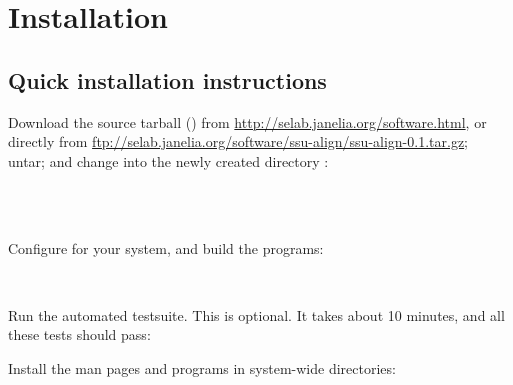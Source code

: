 
\section{Installation}
\label{sec:install}

\subsection{Quick installation instructions}
Download the source tarball () from 
\url{http://selab.janelia.org/software.html}, or directly from 
\url{ftp://selab.janelia.org/software/ssu-align/ssu-align-0.1.tar.gz}; \\
untar; and change into the newly created directory :

\\
\\

Configure for your system, and build the programs:

\\

Run the automated testsuite. This is optional. It takes about 10
minutes, and all these tests should pass:


\begin{comment}
At this point, the programs are in the \prog{src} subdirectory, the
\prog{infernal/src} subdirectory and the
\prog{infernal/easel/miniapps} subdirectory. The
user's guide (this document) is in the \\ 
\prog{documentation/userguide}
subdirectory. The man pages are in the \prog{documentation/manpages}
subdirectory. You can manually move or copy all of these to
appropriate locations if you want. You will want the programs to be in
your \$PATH. 
\end{comment}

Install the man pages and programs in system-wide
directories:

